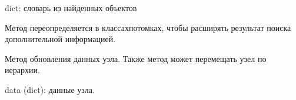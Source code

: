 \documentclass[a4paper,10pt,russian]{sphinxmanual}
\begin{document}
\begin{fulllineitems}
\begin{fulllineitems}
\begin{description}
\sphinxAtStartPar
dict: словарь из найденных объектов

\begin{sphinxVerbatim}[commandchars=\\\{\}]
\PYG{p}{[}
\PYG{p}{[}\PYG{p}{],}
\PYG{p}{[}\PYG{p}{]}
\PYG{p}{]}
\end{sphinxVerbatim}

\end{description}

\end{fulllineitems}



\begin{fulllineitems}

\pysigstartsignatures
{}
\pysigstopsignatures
\sphinxAtStartPar
Метод переопределяется в классах\sphinxhyphen{}потомках, чтобы
расширять результат поиска дополнительной информацией.

\end{fulllineitems}



\begin{fulllineitems}

\pysigstartsignatures
{}
\pysigstopsignatures
\sphinxAtStartPar
Метод обновления данных узла. Также метод может перемещать узел
по иерархии.
\begin{description}
\sphinxAtStartPar
data (dict): данные узла.


\end{description}
\end{fulllineitems}
\end{fulllineitems}
\end{document}
